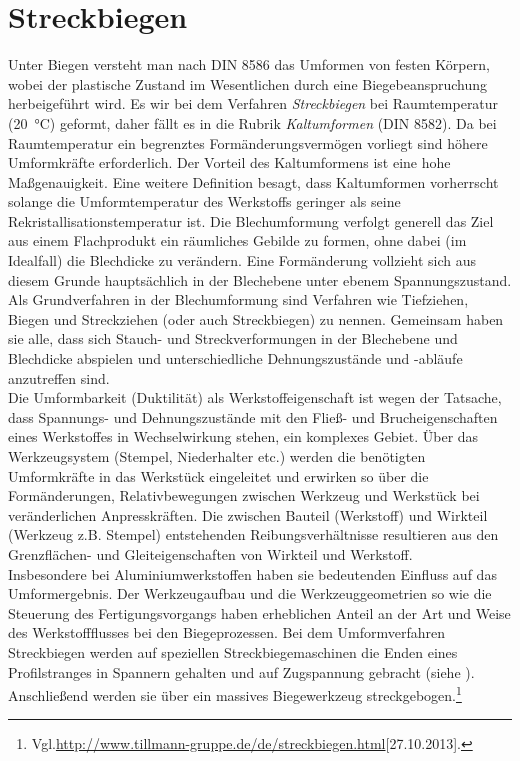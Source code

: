 \documentclass[12pt,a4paper,parskip,twoside,BCOR5mm,headsepline]{scrartcl}
\begin{document}
	 	 	 	 
	 	 	 	 

\section{Streckbiegen}
Unter Biegen versteht man nach DIN 8586 das Umformen von festen Körpern, wobei der plastische Zustand im Wesentlichen durch eine Biegebeanspruchung herbeigeführt wird.\autocite[376]{hu} Es wir bei dem Verfahren \emph{Streckbiegen} bei Raumtemperatur (\SI{20}{\degreeCelsius})  geformt, daher fällt es in die Rubrik \emph{Kaltumformen} (DIN 8582). Da bei Raumtemperatur ein begrenztes Formänderungsvermögen vorliegt sind höhere Umformkräfte erforderlich. Der Vorteil des Kaltumformens ist eine hohe Maßgenauigkeit.\autocite[8]{hu}  Eine weitere Definition besagt, dass Kaltumformen vorherrscht solange die Umformtemperatur des Werkstoffs geringer als seine Rekristallisationstemperatur ist.\autocite[187]{fu} Die Blechumformung verfolgt generell das Ziel aus einem Flachprodukt ein räumliches Gebilde zu formen, ohne dabei (im Idealfall) die Blechdicke zu verändern.  Eine Formänderung vollzieht sich aus diesem Grunde hauptsächlich in der Blechebene unter ebenem Spannungszustand. Als Grundverfahren in der Blechumformung sind Verfahren wie Tiefziehen, Biegen und Streckziehen (oder auch Streckbiegen) zu nennen. Gemeinsam haben sie alle, dass sich Stauch- und Streckverformungen in der Blechebene und Blechdicke abspielen und unterschiedliche Dehnungszustände und -abläufe anzutreffen sind.\\ Die Umformbarkeit (Duktilität) als Werkstoffeigenschaft ist wegen der Tatsache, dass  Spannungs- und Dehnungszustände mit den Fließ- und Brucheigenschaften eines Werkstoffes in Wechselwirkung stehen, ein komplexes Gebiet. Über das Werkzeugsystem (Stempel, Niederhalter etc.) werden die benötigten Umformkräfte in das Werkstück eingeleitet und erwirken so über die  Formänderungen, Relativbewegungen zwischen Werkzeug und Werkstück bei veränderlichen Anpresskräften. Die zwischen Bauteil (Werkstoff) und Wirkteil (Werkzeug z.B. Stempel) entstehenden Reibungsverhältnisse resultieren aus den  Grenzflächen- und Gleiteigenschaften von Wirkteil und Werkstoff.\\ Insbesondere bei Aluminiumwerkstoffen haben sie bedeutenden Einfluss auf das Umformergebnis. Der Werkzeugaufbau und die Werkzeuggeometrien so wie die Steuerung des Fertigungsvorgangs haben erheblichen Anteil an der Art und Weise des Werkstoffflusses bei den Biegeprozessen.\autocite[499]{aa}
Bei dem Umformverfahren Streckbiegen werden auf speziellen Streckbiegemaschinen die Enden eines Profilstranges in Spannern gehalten und auf  Zugspannung gebracht (siehe  ). Anschließend werden sie über ein massives Biegewerkzeug streckgebogen.\footnote{Vgl.\url{http://www.tillmann-gruppe.de/de/streckbiegen.html}[27.10.2013].} 
\end{document}
